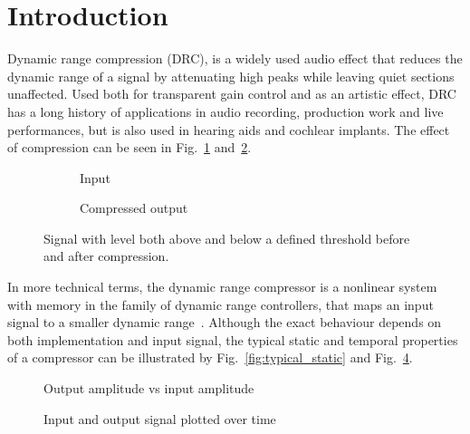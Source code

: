 \documentclass[../main2.tex]{subfiles}
\providecommand{\rootdir}{..}
\begin{document}
\section{Introduction}
Dynamic range compression (DRC), is a widely used audio effect that reduces the dynamic range of a signal by attenuating high peaks while leaving quiet sections unaffected. Used both for transparent gain control and as an artistic effect, DRC has a long history of applications in audio recording, production work and live performances, but is also used in hearing aids and cochlear implants. The effect of compression can be seen in Fig.~\ref{fig:comp_input} and~\ref{fig:comp_output}.

\begin{figure}[ht]
\captionsetup{justification=centering}
\begin{subfigure}{.5\linewidth}
 \centering

\caption{Input} 
\label{fig:comp_input}
\end{subfigure}
\begin{subfigure}{.5\linewidth}
\centering

\caption{Compressed output} 
\label{fig:comp_output}
\end{subfigure}
\caption{Signal with level both above and below a defined threshold before and after compression.} 
\label{fig:comp_inout}
\end{figure}
In more technical terms, the dynamic range compressor is a nonlinear system with memory in the family of dynamic range controllers, that maps an input signal to a smaller dynamic range~\cite{dafx11}. Although the exact behaviour depends on both implementation and input signal, the typical static and temporal properties of a compressor can be illustrated by Fig.~\ref{fig:typical_static} and Fig.~\ref{fig:typical_envelope}.
\begin{figure}[ht]
\captionsetup{justification=centering}

\begin{minipage}[t]{.5\textwidth}
 \centering

\caption{Output amplitude vs input amplitude} 
\label{fig:typical_static}
\end{minipage}%
\begin{minipage}[t]{.5\textwidth}
\centering

\caption{Input and output signal plotted over time} 
\label{fig:typical_envelope}
\end{minipage}
\end{figure}
\end{document}
